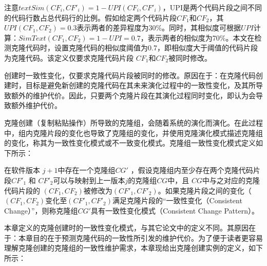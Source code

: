 
注意$\mathit {textSim}(CF_i, CF'_i)= 1 - UPI(CF_i, CF'_i)$，UPI是两个代码片段之间不同的代码行数占总代码行的比例。假如给定两个代码片段$CF_1$和$CF_2$，其$UPI(CF_1,CF_2)=0.3$表示两者的差异程度为30\%。同时，其相似度可根据$UPI$计算：$SimText (CF_1,CF_2)=1-UPI=0.7$，表示两者的相似度为70\%。本文在检测克隆代码时，设置克隆代码的相似度阈值为0.7，即相似度大于阈值的代码片段为克隆代码。该定义仅要求克隆代码片段 $ CF_1 $和$CF_2 $被同时修改。

创建时一致性变化，仅要求克隆代码片段被同时的修改。原因在于：在克隆代码创建时，目标是避免新创建的克隆代码在其未来演化过程中的一致性变化，及其所导致额外的维护代价。因此，只要两个克隆片段在其演化过程同时变化，即认为会导致额外维护代价。

克隆创建（复制粘贴操作）所导致的克隆组，会随着系统的演化而演化。在此过程中，组内克隆片段的变化也导致了克隆组的变化，并使用克隆演化模式描述克隆组的变化，称其为一致性变化模式或不一致变化模式。克隆组一致性变化模式定义如下所示：\\
\begin{definition}
\label{def-creatingpattern}
在软件版本 $j+1$中存在一个克隆组$CG'$ ，假设克隆组内至少存在两个克隆代码片段$CF'_1$ 和 $CF'_2$可以与映射到上一版本$j$的克隆组$CG$中，且 $CG$中与之对应的克隆代码片段的 $(CF_1,CF_2)$被修改为$(CF'_1,CF'_2)$。如果克隆片段之间的变化（ $(CF_1,CF_2)$变化至$(CF'_1,CF'_2)$满足克隆片段的“一致性变化（Consistent Change）”，则称克隆组$CG'$具有一致性变化模式（Consistent Change Pattern）。
\end{definition}


本章定义的克隆创建时的一致性变化模式，与其它论文中的定义不同。其原因在于：本章目的在于预测克隆代码的一致性所引发的维护代价。为了便于读者更容易理解克隆创建的克隆组的一致性维护需求，本章现给出克隆创建实例的定义，如下所示：\\

